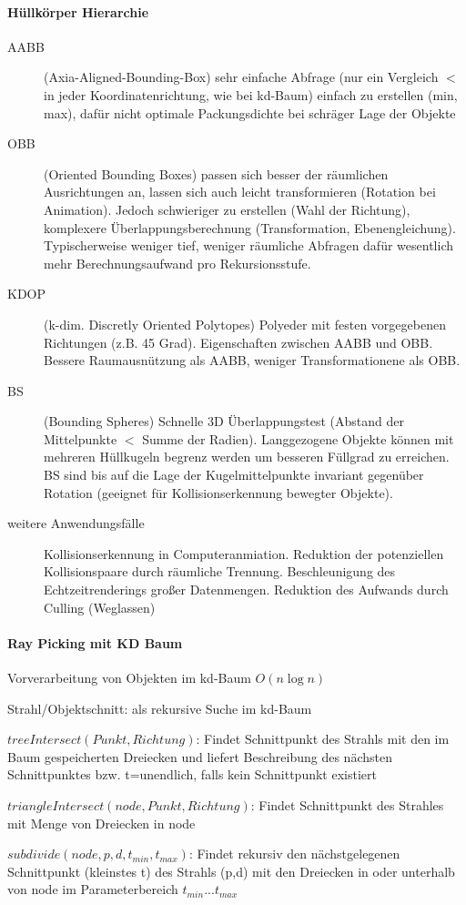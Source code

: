 \documentclass[landscape]{article}
\begin{document}
\begin{multicols}{3}
  \paragraph{Hüllkörper Hierarchie}
  \begin{description}
    \item[AABB] (Axia-Aligned-Bounding-Box) sehr einfache Abfrage (nur ein Vergleich $<$ in jeder Koordinatenrichtung, wie bei kd-Baum) einfach zu erstellen (min, max), dafür nicht optimale Packungsdichte bei schräger Lage der Objekte
    \item[OBB] (Oriented Bounding Boxes) passen sich besser der räumlichen Ausrichtungen an, lassen sich auch leicht transformieren (Rotation bei Animation). Jedoch schwieriger zu erstellen (Wahl der Richtung), komplexere Überlappungsberechnung (Transformation, Ebenengleichung). Typischerweise weniger tief, weniger räumliche Abfragen dafür wesentlich mehr Berechnungsaufwand pro Rekursionsstufe.
    \item[KDOP] (k-dim. Discretly Oriented Polytopes) Polyeder mit festen vorgegebenen Richtungen (z.B. 45 Grad). Eigenschaften zwischen AABB und OBB. Bessere Raumausnützung als AABB, weniger Transformationene als OBB.
    \item[BS] (Bounding Spheres) Schnelle 3D Überlappungstest (Abstand der Mittelpunkte $<$ Summe der Radien). Langgezogene Objekte können mit mehreren Hüllkugeln begrenz werden um besseren Füllgrad zu erreichen. BS sind bis auf die Lage der Kugelmittelpunkte invariant gegenüber Rotation (geeignet für Kollisionserkennung bewegter Objekte).
    \item[weitere Anwendungsfälle] Kollisionserkennung in Computeranmiation. Reduktion der potenziellen Kollisionspaare durch räumliche Trennung. Beschleunigung des Echtzeitrenderings großer Datenmengen. Reduktion des Aufwands durch Culling (Weglassen)
  \end{description}
  
  \paragraph{Ray Picking mit KD Baum}
  \begin{itemize*}
    \item Vorverarbeitung von Objekten im kd-Baum $O(n \log n)$
    \item Strahl/Objektschnitt: als rekursive Suche im kd-Baum
    \item $treeIntersect(Punkt,Richtung)$: Findet Schnittpunkt des Strahls mit den im Baum gespeicherten Dreiecken und liefert Beschreibung des nächsten Schnittpunktes bzw. t=unendlich, falls kein Schnittpunkt existiert
    \item $triangleIntersect(node,Punkt,Richtung)$: Findet Schnittpunkt des Strahles mit Menge von Dreiecken in node
    \item $subdivide(node, p, d, t_{min}, t_{max})$: Findet rekursiv den nächstgelegenen Schnittpunkt (kleinstes t) des Strahls (p,d) mit den Dreiecken in oder unterhalb von node im Parameterbereich $t_{min} ...t_{max}$
  \end{itemize*}
  

\end{multicols}
\end{document}
